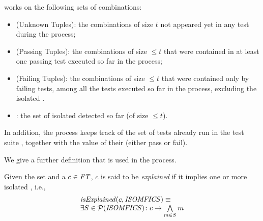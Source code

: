 \begin{tikzborder}{\cite{Gargantini16:validation}}
\begin{tikzborder}{\cite{gargantini_combinatorial_2017}}
\begin{tikzborder}{\cite{gargantini_combinatorial_2017}}
\begin{tikzborder}{\cite{garn2019}}
\begin{tikzborder}{\cite{arcaini2019achieving}}
\begin{tikzborder}{}
\begin{algorithm}[!htb]
\begin{algorithmic}[1]
		\label{line:initUT}
		\EndWhile
	\end{algorithmic}
	\caption{\mixt}
	\label{alg:mixTgFlT}
\end{algorithm}

\mixt works on the following sets of combinations:
%
\begin{itemize}
	\item \textbf{\ut} (Unknown Tuples): the combinations of size $t$ not appeared yet in any test during the process;
	\item \textbf{\pt} (Passing Tuples): the combinations of size $\le t$ that were contained in at least one passing test executed so far in the process;
	\item \textbf{\ft} (Failing Tuples): the combinations of size $\le t$ that were contained only by failing tests, among all the tests executed so far in the process, excluding the isolated \mfics.
	\item \textbf{\isoMficsSet}: the set of isolated \mfics detected so far (of size $\le t$).
\end{itemize}
%
In addition, the process keeps track of the set of tests already run in the test suite \ts, together with the value of their \result (either pass or fail).

We give a further definition that is used in the process.

\begin{defn}\label{def:explainedFic}
	Given the set \isoMficsSet and a \fic $c \in \mathit{FT}$, $c$ is said to be \emph{explained} if it implies one or more isolated \mfics, i.e.,
	\[
	\begin{array}{l}
	\mathit{isExplained}(c, \mathit{ISOMFICS}) \equiv\\
	\exists S \in \mathcal{P}(\mathit{ISOMFICS}) \colon c \rightarrow \bigwedge\limits_{m \in S} m
	\end{array}
	\]
\end{defn}


\end{tikzborder}
\end{tikzborder}
\end{tikzborder}
\end{tikzborder}
\end{tikzborder}
\end{tikzborder}
